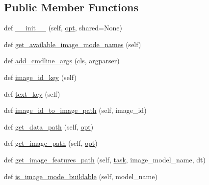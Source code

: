 \subsection*{Public Member Functions}
\begin{DoxyCompactItemize}
\item 
def \hyperlink{classparlai_1_1core_1_1teachers_1_1AbstractImageTeacher_aab36cededc1817fee5109293bd62c51d}{\+\_\+\+\_\+init\+\_\+\+\_\+} (self, \hyperlink{classparlai_1_1core_1_1teachers_1_1AbstractImageTeacher_aa7ca0df94cb27a11487e40343cc84de6}{opt}, shared=None)
\item 
def \hyperlink{classparlai_1_1core_1_1teachers_1_1AbstractImageTeacher_ab64513ca6c2b1c358f180ee0846b26e0}{get\+\_\+available\+\_\+image\+\_\+mode\+\_\+names} (self)
\item 
def \hyperlink{classparlai_1_1core_1_1teachers_1_1AbstractImageTeacher_a2735899e5787c14da39443179db6c84b}{add\+\_\+cmdline\+\_\+args} (cls, argparser)
\item 
def \hyperlink{classparlai_1_1core_1_1teachers_1_1AbstractImageTeacher_ada83f1832b7c75f9daab8e4d196ba893}{image\+\_\+id\+\_\+key} (self)
\item 
def \hyperlink{classparlai_1_1core_1_1teachers_1_1AbstractImageTeacher_a95e578f9650f77c1d397319b9050af51}{text\+\_\+key} (self)
\item 
def \hyperlink{classparlai_1_1core_1_1teachers_1_1AbstractImageTeacher_aa75286450850638274d7f076a81f7e90}{image\+\_\+id\+\_\+to\+\_\+image\+\_\+path} (self, image\+\_\+id)
\item 
def \hyperlink{classparlai_1_1core_1_1teachers_1_1AbstractImageTeacher_aa3c1da773025838ffa03b47c3fc21c7e}{get\+\_\+data\+\_\+path} (self, \hyperlink{classparlai_1_1core_1_1teachers_1_1AbstractImageTeacher_aa7ca0df94cb27a11487e40343cc84de6}{opt})
\item 
def \hyperlink{classparlai_1_1core_1_1teachers_1_1AbstractImageTeacher_a22a280003b7f4202e0d917040bd56eb8}{get\+\_\+image\+\_\+path} (self, \hyperlink{classparlai_1_1core_1_1teachers_1_1AbstractImageTeacher_aa7ca0df94cb27a11487e40343cc84de6}{opt})
\item 
def \hyperlink{classparlai_1_1core_1_1teachers_1_1AbstractImageTeacher_a29fce019ea9795947235ba208aa4bfb0}{get\+\_\+image\+\_\+features\+\_\+path} (self, \hyperlink{classparlai_1_1core_1_1teachers_1_1AbstractImageTeacher_a78dca77e43183d22d75140ca113d821c}{task}, image\+\_\+model\+\_\+name, dt)
\item 
def \hyperlink{classparlai_1_1core_1_1teachers_1_1AbstractImageTeacher_a16c2be0ffe61e136dea2a63cbd918af5}{is\+\_\+image\+\_\+mode\+\_\+buildable} (self, model\+\_\+name)

\end{DoxyCompactItemize}
